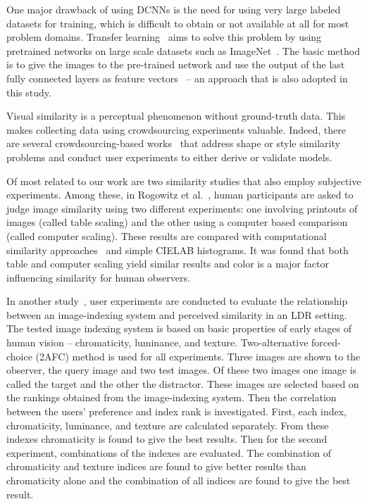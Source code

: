 One major drawback of using DCNNs is the need for using very large labeled datasets for training, which is difficult to obtain or not available at all for most problem domains. Transfer learning~\cite{yosinski2014transferable} aims to solve this problem by using pretrained networks on large scale datasets such as ImageNet~\cite{russakovsky2015imagenet}. The basic method is to give the images to the pre-trained network and use the output of the last fully connected layers as feature vectors~\cite{donahue2014decaf,wan2014deep} -- an approach that is also adopted in this study.

Visual similarity is a perceptual phenomenon without ground-truth data. This makes collecting data using crowdsourcing experiments valuable. Indeed, there are several crowdsourcing-based works~\cite{lun2015elements,saleh2015learning,kleiman2016toward} that address shape or style similarity problems and conduct user experiments to either derive or validate models. 

Of most related to our work are two similarity studies that also employ subjective experiments. Among these, in Rogowitz et al.~\cite{rogowitz1998perceptual}, human participants are asked to judge image similarity using two different experiments: one involving printouts of images (called table scaling) and the other using a computer based comparison (called computer scaling). These results are compared with computational similarity approaches~\cite{frese1997methodology} and simple CIELAB histograms. It was found that both table and computer scaling yield similar results and color is a major factor influencing similarity for human observers.

In another study~\cite{neumann2006image}, user experiments are conducted to evaluate the relationship between an image-indexing system and perceived similarity in an LDR setting. The tested image indexing system is based on basic properties of early stages of human vision -- chromaticity, luminance, and texture. Two-alternative forced-choice (2AFC) method is used for all experiments. Three images are shown to the observer, the query image and two test images. Of these two images one image is called the target and the other the distractor. These images are selected based on the rankings obtained from the image-indexing system. Then the correlation between the users' preference and index rank is investigated. First, each index, chromaticity, luminance, and texture are calculated separately. From these indexes chromaticity is found to give the best results. Then for the second experiment, combinations of the indexes are evaluated. The combination of chromaticity and texture indices are found to give better results than chromaticity alone and the combination of all indices are found to give the best result.



